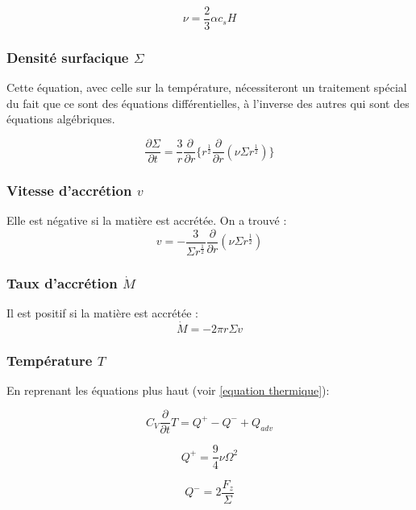\documentclass[a4paper,12pt]{article}
\newcommand{\derivt}[1]{\frac{\partial}{\partial t} #1}
\newcommand{\derivr}[1]{\frac{\partial}{\partial r} #1}
\begin{document}
\begin{equation}
    \nu = \frac{2}{3}\alpha c_s H
\end{equation}

\subsubsection{Densité surfacique $\Sigma$}
Cette équation, avec celle sur la température, nécessiteront un traitement spécial du fait que ce sont des équations différentielles, à l'inverse des autres qui sont des équations algébriques.

\begin{equation}
    \frac{\partial {\Sigma}}{\partial t} = \frac{3}{r}\derivr{ \big \{ r^{\frac{1}{2}} \derivr{(\nu \Sigma r^{\frac{1}{2}})} \big \}}
\end{equation}

\subsubsection{Vitesse d'accrétion $v$}
Elle est négative si la matière est accrétée. On a trouvé :
\begin{equation}
    v = -\frac{3}{\Sigma r^{\frac{1}{2}}}\derivr{(\nu \Sigma r^{\frac{1}{2}})}
\end{equation}

\subsubsection{Taux d'accrétion $\dot M$}
Il est positif si la matière est accrétée :
\begin{equation*}
    \dot M = - 2 \pi r \Sigma v
\end{equation*}

\subsubsection{Température $T$}
En reprenant les équations plus haut (voir \eqref{equation thermique}):

\begin{equation}
    \label{Eq:Temperature}
    C_V \derivt{T}=Q^+ - Q^- +Q_{adv}
\end{equation}

\begin{equation}
    Q^+ = \frac{9}{4}\nu \Omega ^2
\end{equation}

\begin{equation}
    Q^-= 2\frac{F_z}{\Sigma}
\end{equation}
\end{document}
